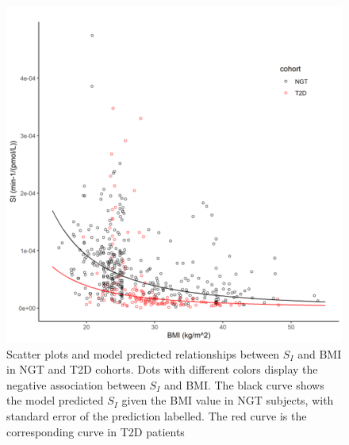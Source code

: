 \documentclass[utf8]{frontiersSCNS} %
\begin{document}
\begin{figure}[h!]
\begin{center}
\includegraphics[width=15cm]{SI_BMI.PNG}
\end{center}
\caption{Scatter plots and model predicted relationships between $S_I$ and BMI in NGT and T2D cohorts. Dots with different colors display the negative association between $S_I$ and BMI. The black curve shows the model predicted $S_I$ given the BMI value in NGT subjects, with standard error of the prediction labelled. The red curve is the corresponding curve in T2D patients}
\label{fig: SI_BMI}
\end{figure}
\end{document}
